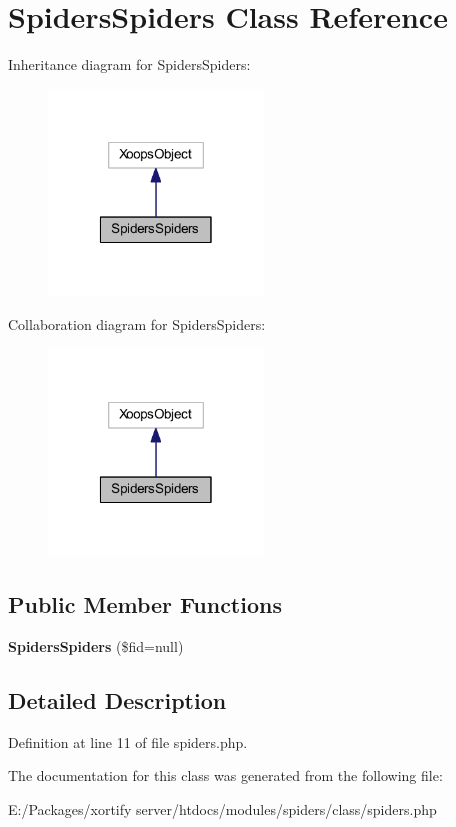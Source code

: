 \hypertarget{class_spiders_spiders}{\section{Spiders\-Spiders Class Reference}
\label{class_spiders_spiders}
}


Inheritance diagram for Spiders\-Spiders\-:
\nopagebreak
\begin{figure}[H]
\begin{center}
\leavevmode
\includegraphics[width=162pt]{class_spiders_spiders__inherit__graph}
\end{center}
\end{figure}


Collaboration diagram for Spiders\-Spiders\-:
\nopagebreak
\begin{figure}[H]
\begin{center}
\leavevmode
\includegraphics[width=162pt]{class_spiders_spiders__coll__graph}
\end{center}
\end{figure}
\subsection*{Public Member Functions}
\begin{DoxyCompactItemize}
\item 
\hypertarget{class_spiders_spiders_a93ac2051078a8e8f6ff1b4ea1dc143b4}{{\bfseries Spiders\-Spiders} (\$fid=null)}\label{class_spiders_spiders_a93ac2051078a8e8f6ff1b4ea1dc143b4}

\end{DoxyCompactItemize}


\subsection{Detailed Description}


Definition at line 11 of file spiders.\-php.



The documentation for this class was generated from the following file\-:\begin{DoxyCompactItemize}
\item 
E\-:/\-Packages/xortify server/htdocs/modules/spiders/class/spiders.\-php\end{DoxyCompactItemize}
